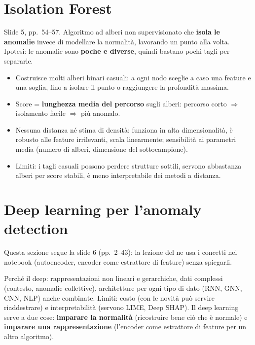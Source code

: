 \section{Isolation Forest}
Slide 5, pp.\ 54--57. Algoritmo ad alberi non supervisionato che \textbf{isola le anomalie} invece di modellare la normalità, lavorando un
punto alla volta. Ipotesi: le anomalie sono \textbf{poche e diverse}, quindi bastano pochi tagli per separarle.
\begin{itemize}
  \item Costruisce molti alberi binari casuali: a ogni nodo sceglie a caso una feature e una soglia, fino a isolare il punto o raggiungere la
        profondità massima.
  \item Score = \textbf{lunghezza media del percorso} sugli alberi: percorso corto $\Rightarrow$ isolamento facile $\Rightarrow$ più anomalo.
  \item Nessuna distanza né stima di densità: funziona in alta dimensionalità, è robusto alle feature irrilevanti, scala linearmente;
        sensibilità ai parametri media (numero di alberi, dimensione del sottocampione).
  \item Limiti: i tagli casuali possono perdere strutture sottili, servono abbastanza alberi per score stabili, è meno interpretabile dei
        metodi a distanza.
\end{itemize}

\section{Deep learning per l'anomaly detection}
\begin{nota}
Questa sezione segue la slide 6 (pp.\ 2--43): la lezione del  ne usa i concetti nel notebook (autoencoder, encoder
come estrattore di feature) senza spiegarli.
\end{nota}
Perché il deep: rappresentazioni non lineari e gerarchiche, dati complessi (contesto, anomalie collettive), architetture per ogni tipo di
dato (RNN, GNN, CNN, NLP) anche combinate. Limiti: costo (con le novità può servire riaddestrare) e interpretabilità (servono LIME,
Deep SHAP). Il deep learning serve a due cose: \textbf{imparare la normalità} (ricostruire bene ciò che è normale) e \textbf{imparare una
rappresentazione} (l'encoder come estrattore di feature per un altro algoritmo).

